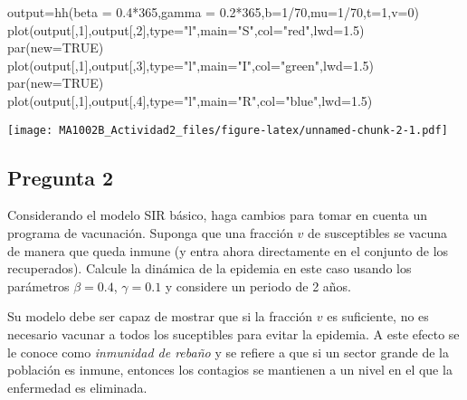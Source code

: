 \documentclass[
]{article}
\newenvironment{Shaded}{\begin{snugshade}}{\end{snugshade}}
\newcommand{\AttributeTok}[1]{\textcolor[rgb]{0.77,0.63,0.00}{#1}}
\newcommand{\ConstantTok}[1]{\textcolor[rgb]{0.00,0.00,0.00}{#1}}
\newcommand{\DecValTok}[1]{\textcolor[rgb]{0.00,0.00,0.81}{#1}}
\newcommand{\FloatTok}[1]{\textcolor[rgb]{0.00,0.00,0.81}{#1}}
\newcommand{\FunctionTok}[1]{\textcolor[rgb]{0.00,0.00,0.00}{#1}}
\newcommand{\NormalTok}[1]{#1}
\newcommand{\OtherTok}[1]{\textcolor[rgb]{0.56,0.35,0.01}{#1}}
\newcommand{\SpecialCharTok}[1]{\textcolor[rgb]{0.00,0.00,0.00}{#1}}
\newcommand{\StringTok}[1]{\textcolor[rgb]{0.31,0.60,0.02}{#1}}
\begin{document}
\begin{Shaded}
\begin{Highlighting}[]
\NormalTok{output}\OtherTok{=}\FunctionTok{hh}\NormalTok{(}\AttributeTok{beta =} \FloatTok{0.4}\SpecialCharTok{*}\DecValTok{365}\NormalTok{,}\AttributeTok{gamma =} \FloatTok{0.2}\SpecialCharTok{*}\DecValTok{365}\NormalTok{,}\AttributeTok{b=}\DecValTok{1}\SpecialCharTok{/}\DecValTok{70}\NormalTok{,}\AttributeTok{mu=}\DecValTok{1}\SpecialCharTok{/}\DecValTok{70}\NormalTok{,}\AttributeTok{t=}\DecValTok{1}\NormalTok{,}\AttributeTok{v=}\DecValTok{0}\NormalTok{)}
\FunctionTok{plot}\NormalTok{(output[,}\DecValTok{1}\NormalTok{],output[,}\DecValTok{2}\NormalTok{],}\AttributeTok{type=}\StringTok{"l"}\NormalTok{,}\AttributeTok{main=}\StringTok{"S"}\NormalTok{,}\AttributeTok{col=}\StringTok{"red"}\NormalTok{,}\AttributeTok{lwd=}\FloatTok{1.5}\NormalTok{)}
\FunctionTok{par}\NormalTok{(}\AttributeTok{new=}\ConstantTok{TRUE}\NormalTok{)}
\FunctionTok{plot}\NormalTok{(output[,}\DecValTok{1}\NormalTok{],output[,}\DecValTok{3}\NormalTok{],}\AttributeTok{type=}\StringTok{"l"}\NormalTok{,}\AttributeTok{main=}\StringTok{"I"}\NormalTok{,}\AttributeTok{col=}\StringTok{"green"}\NormalTok{,}\AttributeTok{lwd=}\FloatTok{1.5}\NormalTok{)}
\FunctionTok{par}\NormalTok{(}\AttributeTok{new=}\ConstantTok{TRUE}\NormalTok{)}
\FunctionTok{plot}\NormalTok{(output[,}\DecValTok{1}\NormalTok{],output[,}\DecValTok{4}\NormalTok{],}\AttributeTok{type=}\StringTok{"l"}\NormalTok{,}\AttributeTok{main=}\StringTok{"R"}\NormalTok{,}\AttributeTok{col=}\StringTok{"blue"}\NormalTok{,}\AttributeTok{lwd=}\FloatTok{1.5}\NormalTok{)}
\end{Highlighting}
\end{Shaded}

\texttt{[image: MA1002B\_Actividad2\_files/figure-latex/unnamed-chunk-2-1.pdf]}

\hypertarget{pregunta-2}{%
\subsection{Pregunta 2}\label{pregunta-2}}

Considerando el modelo SIR básico, haga cambios para tomar en cuenta un
programa de vacunación. Suponga que una fracción \(v\) de susceptibles
se vacuna de manera que queda inmune (y entra ahora directamente en el
conjunto de los recuperados). Calcule la dinámica de la epidemia en este
caso usando los parámetros \(\beta=0.4\), \(\gamma=0.1\) y considere un
periodo de 2 años.

Su modelo debe ser capaz de mostrar que si la fracción \(v\) es
suficiente, no es necesario vacunar a todos los suceptibles para evitar
la epidemia. A este efecto se le conoce como \emph{inmunidad de rebaño}
y se refiere a que si un sector grande de la población es inmune,
entonces los contagios se mantienen a un nivel en el que la enfermedad
es eliminada.
\end{document}
